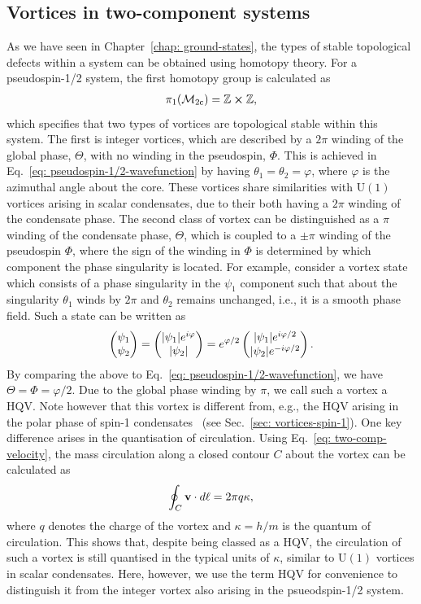 \subsection{Vortices in two-component systems}
As we have seen in Chapter~\ref{chap: ground-states}, the types of stable
topological defects within a system can be obtained using homotopy theory.
For a pseudospin-1/2 system, the first homotopy group is calculated
as~\cite{Eto2011}
\begin{align}
    \pi_1(\mathcal{M}_\text{2c}) = \mathbb{Z} \cross \mathbb{Z},
\end{align}
which specifies that two types of vortices are topological stable within this
system.
The first is integer vortices, which are described by a \(2\pi \) winding of
the global phase, \(\Theta \), with no winding in the pseudospin, \(\Phi \).
This is achieved in Eq.~\eqref{eq: pseudospin-1/2-wavefunction} by having
\(\theta_1=\theta_2=\varphi \), where \(\varphi \) is the azimuthal angle
about the core.
These vortices share similarities with \(\text{U}(1)\) vortices arising in
scalar condensates, due to their both having a \(2\pi \) winding of the
condensate phase.
The second class of vortex can be distinguished as a \(\pi \) winding of the
condensate phase, \(\Theta \), which is coupled to a \(\pm\pi \) winding of the
pseudospin \(\Phi \), where the sign of the winding in \(\Phi \) is determined
by which component the phase singularity is located.
For example, consider a vortex state which consists of a phase singularity in
the \(\psi_1 \) component such that about the singularity \( \theta_1 \) winds
by \( 2\pi \) and \( \theta_2 \) remains unchanged, i.e., it is a smooth phase
field.
Such a state can be written as
\begin{equation}
    \begin{pmatrix}\psi_1\\\psi_2\end{pmatrix}
    = \begin{pmatrix}|\psi_1|e^{i\varphi}\\|\psi_2|\end{pmatrix}
    = e^{\varphi/2}\begin{pmatrix}|\psi_1|e^{i\varphi/2}\\|\psi_2|e^{-i\varphi/2}\end{pmatrix}.
\end{equation}
By comparing the above to Eq.~\eqref{eq: pseudospin-1/2-wavefunction}, we have
\( \Theta=\Phi=\varphi/2 \).
Due to the global phase winding by \(\pi \), we call such a vortex a HQV\@.
Note however that this vortex is different from, e.g., the HQV arising in the
polar phase of spin-1 condensates~\cite{Leonhardt2000, Seo2015} (see
Sec.~\ref{sec: vortices-spin-1}).
One key difference arises in the quantisation of circulation.
Using Eq.~\eqref{eq: two-comp-velocity}, the mass circulation along a closed
contour \(C\) about the vortex can be calculated as
\begin{equation}
    \oint_C\vb{v}\cdot d\vb{\ell} = 2\pi q\kappa,
\end{equation}
where \( q \) denotes the charge of the vortex and \(\kappa=h/m\) is the
quantum of circulation.
This shows that, despite being classed as a HQV, the circulation of such a
vortex is still quantised in the typical units of \(\kappa \), similar to
\(\text{U}(1)\) vortices in scalar condensates.
Here, however, we use the term HQV for convenience to distinguish it from the
integer vortex also arising in the psueodspin-1/2 system.

